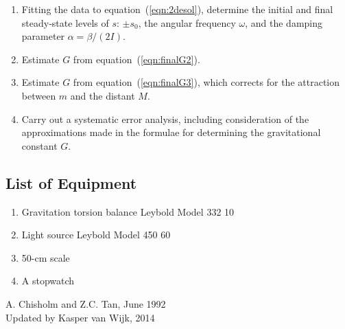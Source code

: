 \documentclass{article}
\begin{document}
\begin{enumerate}[resume]

  
\item Fitting the data to equation~(\ref{eqn:2desol}), determine the
  initial and final steady-state levels of $s$: $\pm s_{0}$, the
  angular frequency $\omega$, and the damping parameter $\alpha =\beta/(2I)$.

\item Estimate $G$ from equation~(\ref{eqn:finalG2}).

\item Estimate $G$ from equation~(\ref{eqn:finalG3}), which corrects for
  the attraction between $m$ and the distant $M$.
  
\item Carry out a systematic error analysis, including consideration
  of the approximations made in the formulae for determining the
  gravitational constant $G$.
\end{enumerate}%

\subsection*{List of Equipment}%


\begin{enumerate}
\item  Gravitation torsion balance Leybold Model 332 10
\item  Light source Leybold Model 450 60
\item 50-cm scale
\item A stopwatch
\end{enumerate}

\noindent A. Chisholm and Z.C. Tan, June 1992\\
Updated by Kasper van Wijk, 2014
\end{document}

